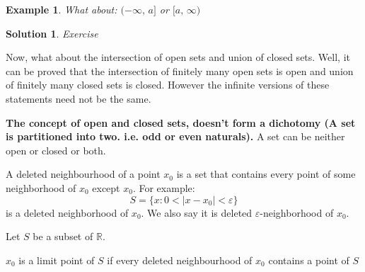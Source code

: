 \documentclass{article}
\newcommand{\R}{\mathbb{R}}
\newcommand{\e}{\varepsilon}
\newtheorem{example}{Example}
\newtheorem{solution}{Solution}
\begin{document}
\begin{example}{
 What about: $\displaystyle{(-\infty,\,a]}$ or $\displaystyle{[a,\,\infty)}$
}\end{example}\begin{solution}{
  Exercise
}\end{solution}\vspace{10pt}

Now, what about the intersection of open sets and union of closed sets. Well, it can be proved that the intersection of finitely many open sets is open and union of finitely many closed sets is closed. However the infinite versions of these statements need not be the same.

{\color{red} \textbf{The concept of open and closed sets, doesn't form a dichotomy (A set is partitioned into two. i.e. odd or even naturals). }} A set can be neither open or closed or both.\\

\begin{definition}{}{}
 A {\color{blue} deleted neighbourhood } of a point $\displaystyle{x_0}$ is a set that contains every point of some neighborhood of $\displaystyle{x_0}$ except $\displaystyle{x_0}$. For example:
 $$ S = \{x : 0 < |x - x_0| < \e \} $$
 is a deleted neighborhood of $x_0$. We also say it is deleted $\e$-neighborhood of $x_0$.
\end{definition}\vspace{10pt}

Let $S$ be a subset of $\R$.

\begin{definition}{}{}
  $x_0$ is a {\color{blue} limit point } of $S$ if every deleted neighbourhood of $x_0$ contains a point of $S$
\end{definition}\vspace{10pt}
\end{document}
